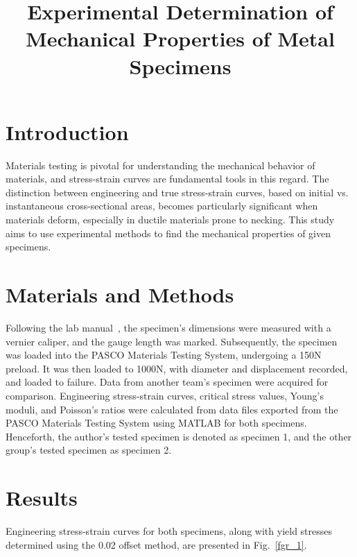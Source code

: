 \documentclass[conference, letterpaper]{IEEEtran}
\begin{document}
\title{Experimental Determination of Mechanical Properties of Metal Specimens}

\author{}

\maketitle

\section{Introduction}
    Materials testing is pivotal for understanding the mechanical behavior of materials, and stress-strain curves are fundamental tools in this regard. The distinction between engineering and true stress-strain curves, based on initial vs. instantaneous cross-sectional areas, becomes particularly significant when materials deform, especially in ductile materials prone to necking. This study aims to use experimental methods to find the mechanical properties of given specimens.

\section{Materials and Methods}
    Following the lab manual~\cite{2OLM2023}, the specimen's dimensions were measured with a vernier caliper, and the gauge length was marked. Subsequently, the specimen was loaded into the PASCO Materials Testing System, undergoing a 150N preload. It was then loaded to 1000N, with diameter and displacement recorded, and loaded to failure. Data from another team's specimen were acquired for comparison. Engineering stress-strain curves, critical stress values, Young's moduli, and Poisson's ratios were calculated from data files exported from the PASCO Materials Testing System using MATLAB for both specimens. Henceforth, the author's tested specimen is denoted as specimen 1, and the other group's tested specimen as specimen 2.

\section{Results}

    Engineering stress-strain curves for both specimens, along with yield stresses determined using the 0.02 offset method, are presented in Fig.~\ref{fgr_1}.
\end{document}
